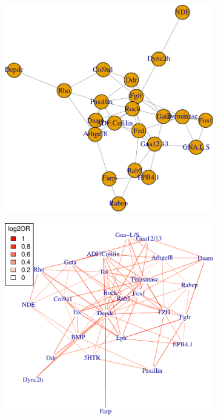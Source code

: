 \documentclass{article}
\begin{document}
\begin{figure}
\begin{subfigure}[b]{0.4\textwidth}
		\caption{}
		\label{}

	\end{subfigure} 
	\vspace{1cm}
	\begin{subfigure}[b]{0.5\textwidth}
		\includegraphics[width=\textwidth]{interactions.pdf}
		\caption{}
		\label{}
	\end{subfigure}
	\hfill
	\begin{subfigure}[b]{0.5\textwidth}
		\includegraphics[width=\textwidth]{hyper.k.pdf}

\end{subfigure}
\end{figure}
\end{document}
